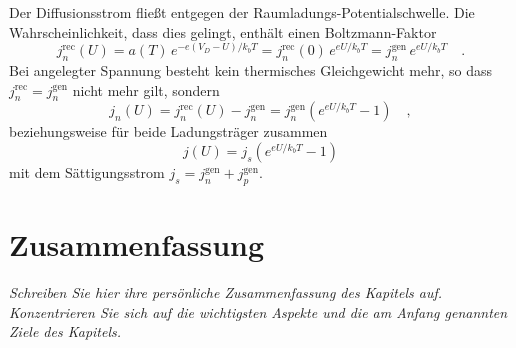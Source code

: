 Der Diffusionsstrom fließt entgegen der Raumladungs-Potentialschwelle. Die Wahrscheinlichkeit, dass dies gelingt, enthält einen Boltzmann-Faktor
\begin{equation}
    j_n^\text{rec}(U) = a(T) \, e^{-e (V_D - U) / k_b T} =  j_n^\text{rec}(0) \, e^{e U / k_b T}
    = j_n^\text{gen} \, e^{e U / k_b T}
    \quad .
\end{equation}
Bei angelegter Spannung besteht kein thermisches Gleichgewicht mehr, so dass $j_n^\text{rec} = j_n^\text{gen}$ nicht mehr gilt, sondern
\begin{equation}
    j_n(U) = j_n^\text{rec}(U) - j_n^\text{gen} = j_n^\text{gen} \left(  e^{e U / k_b T} - 1 \right) \quad ,
\end{equation}
beziehungsweise für beide Ladungsträger zusammen 
\begin{equation}
    j(U) =  j_s \left(  e^{e U / k_b T} - 1 \right)
\end{equation}
mit dem Sättigungsstrom $j_s = j_n^\text{gen}  + j_p^\text{gen} $.

\newpage
\section{Zusammenfassung}

\textit{Schreiben Sie hier ihre persönliche Zusammenfassung des Kapitels auf. Konzentrieren Sie sich auf die wichtigsten Aspekte und die am Anfang genannten Ziele des Kapitels.}

\vspace*{10cm}

\printbibliography[segment=\therefsegment,heading=subbibliography]
